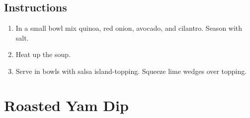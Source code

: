 \documentclass[ansiapaper,10pt,english]{sphinxmanual}
\begin{document}

%
\begin{sphinxVerbatim}[commandchars=\\\{\}]
   

    

  

    

   
\end{sphinxVerbatim}


\section{Instructions}
\label{\detokenize{RRPS_Quinoa_Salsa:instructions}}\begin{enumerate}
\item {} 
In a small bowl mix quinoa, red onion, avocado, and cilantro. Season with salt.

\item {} 
Heat up the soup.

\item {} 
Serve in bowls with salsa island-topping. Squeeze lime wedges over topping.

\end{enumerate}


\chapter{Roasted Yam Dip}
\label{\detokenize{roasted_yam_dip:roasted-yam-dip}}\label{\detokenize{roasted_yam_dip::doc}}
\end{document}
